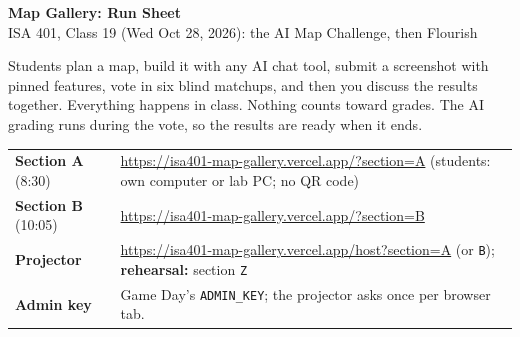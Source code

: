 \documentclass[9pt,letterpaper]{extarticle}
\newcommand{\site}{isa401-map-gallery.vercel.app}
\begin{document}
\begin{center}
	{\LARGE\bfseries Map Gallery: Run Sheet}\\[1pt]
	{\large ISA 401, Class 19 (Wed Oct 28, 2026): the AI Map Challenge, then Flourish}
\end{center}

\vspace{-4pt}
Students plan a map, build it with any AI chat tool, submit a screenshot with pinned features, vote in six blind matchups, and then you discuss the results together. Everything happens in class. Nothing counts toward grades. The AI grading runs during the vote, so the results are ready when it ends.

\smallskip
\begin{tabularx}{\textwidth}{@{}lX@{}}
	\hline
	\textbf{Section A} (8:30) & \url{https://\site/?section=A} \quad (students: own computer or lab PC; no QR code) \\
	\textbf{Section B} (10:05) & \url{https://\site/?section=B} \\
	\textbf{Projector} & \url{https://\site/host?section=A} (or \texttt{B}); \textbf{rehearsal:} section \texttt{Z} \\
	\textbf{Admin key} & Game Day's \texttt{ADMIN\_KEY}; the projector asks once per browser tab. \\
	\hline
\end{tabularx}
\end{document}
